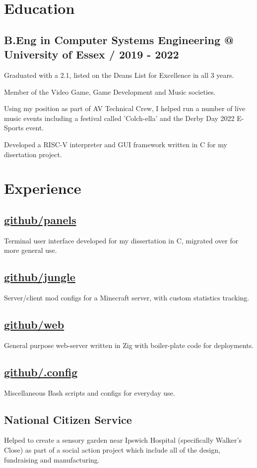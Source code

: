 \documentclass{article}
\newcommand{\github}{https://github.com/mskorczak}
\begin{document}
\section{Education}

\subsection{B.Eng in Computer Systems Engineering @ University of Essex / 2019 - 2022}
\begin{compactitem}
\item Graduated with a 2.1, listed on the Deans List for Excellence in all 3 years.
\item Member of the Video Game, Game Development and Music societies.
\item Using my position as part of AV Technical Crew, I helped run a number of live music events including a festival called 'Colch-ella' and the Derby Day 2022 E-Sports event.
\item Developed a RISC-V interpreter and GUI framework written in C for my disertation project.
\end{compactitem}

\section{Experience}

\subsection{\href{\github/panels}{github/panels}} Terminal user interface developed for my dissertation in C, migrated over for more general use.
\subsection{\href{\github/jungle}{github/jungle}} Server/client mod configs for a Minecraft server, with custom statistics tracking.
\subsection{\href{\github/web}{github/web}} General purpose web-server written in Zig with boiler-plate code for deployments.
\subsection{\href{\github/.config}{github/.config}} Miscellaneous Bash scripts and configs for everyday use.  
\subsection{National Citizen Service} Helped to create a sensory garden near Ipswich Hospital (specifically Walker's Close) as part of a social action project which include all of the design, fundraising and manufacturing.
\end{document}
